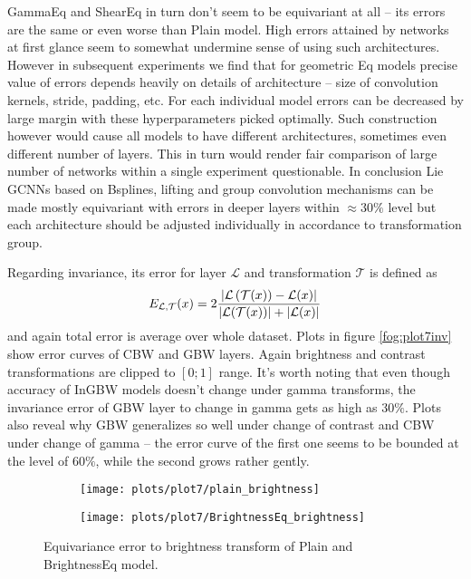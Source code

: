     GammaEq and ShearEq in turn don't seem to be equivariant
    at all -- its errors are the same or even worse
    than Plain model. High errors attained by networks at first glance seem to
    somewhat undermine sense of using such architectures.
    However
    in subsequent experiments we find that for geometric Eq models
    precise value of errors
    depends heavily on details of architecture -- size of convolution
    kernels, stride, padding, etc. For each individual model errors can
    be decreased by large margin with these hyperparameters picked
    optimally. Such construction however would cause all models to have different
    architectures, sometimes even different number of layers.
    This in
    turn would render fair comparison of large number of networks within
    a single experiment questionable.
    In conclusion Lie GCNNs based on Bsplines, lifting and group
    convolution mechanisms
    can be made mostly equivariant with errors in deeper layers within $\approx
    30\%$ level but each architecture should be adjusted individually in
    accordance to transformation group.

    Regarding invariance, its error for layer $\mathcal{L}$
    and transformation $\mathcal{T}$ is defined as
    $$ E_{\mathcal{L},\mathcal{T}}(x) = 2\frac{\left|\mathcal{L}\left(\mathcal{T}(x)\right) -
    \mathcal{L}(x)\right|}
    {\left|\mathcal{L}(\mathcal{T}(x))\right| + \left|\mathcal{L}(x)\right|} $$
    and again total error is average over whole dataset.
    Plots in figure \ref{fog:plot7inv} show error curves of CBW and GBW layers.
    Again brightness and contrast transformations are clipped to $[0;1]$ range.
    It's worth noting that even though accuracy of InGBW models doesn't change
    under gamma transforms, the invariance error of GBW layer to change in gamma
    gets as high as $30\%$. Plots also reveal why GBW generalizes so well under
    change of contrast and CBW under change of gamma -- the error curve of the
    first one seems to be bounded at the level of $60\%$, while the second grows
    rather gently.

    \begin{figure}[h!]
    \begin{adjustwidth}{-11em}{-11em}
        \centering
        \begin{subfigure}{0.6\textwidth}
            \texttt{[image: plots/plot7/plain\_brightness]}
        \end{subfigure}
        \begin{subfigure}{0.6\textwidth}
            \texttt{[image: plots/plot7/BrightnessEq\_brightness]}
        \end{subfigure}
    \end{adjustwidth}
        \caption{Equivariance error to brightness transform of Plain and BrightnessEq
        model.}
        \label{fig:plot7brightness}
    \end{figure}

